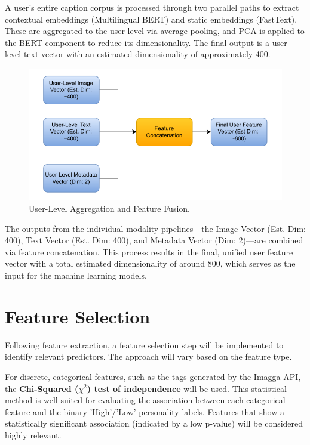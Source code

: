  A user's entire caption corpus is processed through two parallel paths to extract contextual embeddings (Multilingual BERT) and static embeddings (FastText). These are aggregated to the user level via average pooling, and PCA is applied to the BERT component to reduce its dimensionality. The final output is a user-level text vector with an estimated dimensionality of approximately 400.

\begin{figure}[H]
	\centering
	\includegraphics[width=\textwidth]{"figures/Fusion-Diagram.pdf"}
	\caption{User-Level Aggregation and Feature Fusion.}
	\label{fig:fusion_diagram}
\end{figure}

The outputs from the individual modality pipelines—the Image Vector (Est. Dim: 400), Text Vector (Est. Dim: 400), and Metadata Vector (Dim: 2)—are combined via feature concatenation. This process results in the final, unified user feature vector with a total estimated dimensionality of around 800, which serves as the input for the machine learning models.

\section{Feature Selection}
Following feature extraction, a feature selection step will be implemented to identify relevant predictors. The approach will vary based on the feature type.

For discrete, categorical features, such as the tags generated by the Imagga API, the \textbf{Chi-Squared ($\chi^2$) test of independence} will be used. This statistical method is well-suited for evaluating the association between each categorical feature and the binary 'High'/'Low' personality labels. Features that show a statistically significant association (indicated by a low p-value) will be considered highly relevant.

